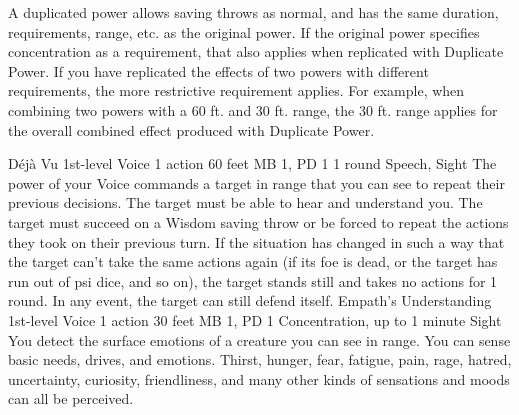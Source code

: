 A duplicated power allows saving throws as normal, and has the same
duration, requirements, range, etc. as the original power.
If the original power specifies concentration as a requirement,
that also applies when replicated with Duplicate Power.
If you have replicated the effects of two powers with different requirements,
the more restrictive requirement applies.
For example, when combining two powers with a 60 ft. and 30 ft. range,
the 30 ft. range applies for the overall combined effect produced with Duplicate Power. 

\DndPowerHeader%
    {Déjà Vu\label{pwr:déjà-vu}}
    {1st-level Voice}
    {1 action}
    {60 feet}
    {MB 1, PD 1}
    {1 round}
    {Speech, Sight}
The power of your Voice commands a target
in range that you can see to repeat their previous decisions.
The target must be able to hear and understand you.
The target must succeed on a Wisdom saving throw or be forced
to repeat the actions they took on their previous turn. If
the situation has changed in such a way that the target can't
take the same actions again (if its foe is dead, or the target
has run out of psi dice, and so on), the target stands still
and takes no actions for 1 round. In any event, the target
can still defend itself.
\DndPowerHeader%
    {Empath's Understanding\label{pwr:empaths-understanding}}
    {1st-level Voice}
    {1 action}
    {30 feet}
    {MB 1, PD 1}
    {Concentration, up to 1 minute}
    {Sight}
You detect the surface emotions of a creature
you can see in range. You can sense basic needs, drives, and
emotions. Thirst, hunger, fear, fatigue, pain, rage, hatred,
uncertainty, curiosity, friendliness, and many other kinds
of sensations and moods can all be perceived.


